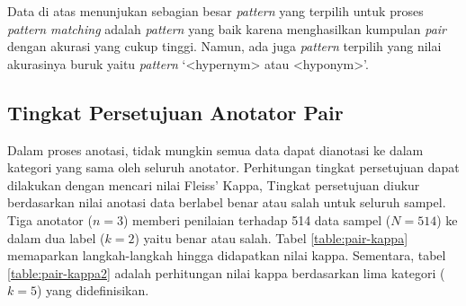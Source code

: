 \begin{table}
  \centering
  \caption{Akurasi \textit{pair} berdasarkan \textit{pattern}}
  \label{table:akurasi-pair-patt}
\end{table}

Data di atas menunjukan sebagian besar \textit{pattern} yang terpilih untuk proses \textit{pattern matching} adalah \textit{pattern} yang baik karena menghasilkan kumpulan \textit{pair} dengan akurasi yang cukup tinggi. Namun, ada juga \textit{pattern} terpilih yang nilai akurasinya buruk yaitu \textit{pattern} `<hypernym> atau <hyponym>'.

\subsection{Tingkat Persetujuan Anotator Pair}
Dalam proses anotasi, tidak mungkin semua data dapat dianotasi ke dalam kategori yang sama oleh seluruh anotator. Perhitungan tingkat persetujuan dapat dilakukan dengan mencari nilai Fleiss' Kappa, Tingkat persetujuan diukur berdasarkan nilai anotasi data berlabel benar atau salah untuk seluruh sampel. Tiga anotator ($n=3$) memberi penilaian terhadap 514 data sampel ($N=514$) ke dalam dua label ($k=2$) yaitu benar atau salah. Tabel \ref{table:pair-kappa} memaparkan langkah-langkah hingga didapatkan nilai kappa. Sementara, tabel \ref{table:pair-kappa2} adalah perhitungan nilai kappa berdasarkan lima kategori ($k=5$) yang didefinisikan.

